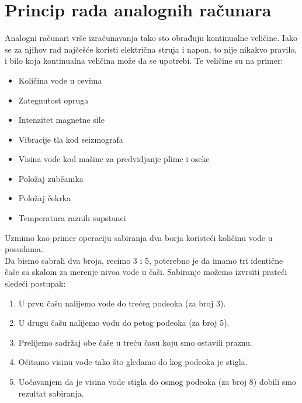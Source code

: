 \documentclass[a4paper]{article}
\begin{document}
\section{Princip rada analognih računara}
Analogni računari vrše izračunavanja tako sto obrađuju kontinualne veličine. Iako se  za njihov rad najčešće koristi električna struja i napon, to nije nikakvo pravilo, i bilo koja kontinualna veličina može da se upotrebi. Te veličine su na primer: \begin{itemize}
				\item Količina vode u cevima
				\item Zategnutost opruga
				\item Intenzitet magnetne sile
				\item Vibracije tla kod seizmografa
				\item Visina vode kod mašine za predvidjanje plime i oseke \cite{tide}
				\item Položaj zubčanika
				\item Položaj čekrka
				\item Temperatura raznih supstanci
			\end{itemize}
			
\bigskip

    
    Uzmimo kao primer operaciju sabiranja dva borja koristeći količinu vode u posudama.\\
    Da bismo sabrali dva broja, recimo 3 i 5, poterebno je da imamo tri identične čaše sa skalom za merenje nivoa vode u čaši. Sabiranje možemo izvrsiti prateći sledeći postupak:\begin{enumerate}
        \item U prvu čašu nalijemo vode do trećeg podeoka (za broj 3).
        \item U drugu čašu nalijemo vodu do petog podeoka (za broj 5).
        \item Prelijemo sadržaj obe čaše u treću času koju smo ostavili praznu.
        \item Očitamo visinu vode tako što gledamo do kog podeoka je stigla.
        \item Uočavanjem da je visina vode stigla do osmog podeoka (za broj 8) dobili smo rezultat sabiranja.
    \end{enumerate}
    
\bigskip
\end{document}
